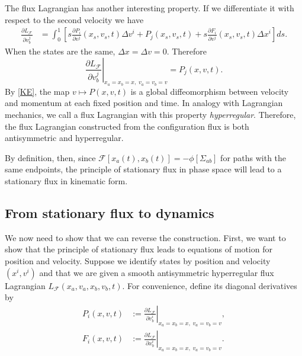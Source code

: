 \documentclass[nofootinbib,aps,pre]{revtex4-2}
\begin{document}
The flux Lagrangian has another interesting property. If we differentiate it with respect to the second velocity we have
\begin{equation}
	\begin{aligned}
		\frac{\partial L_{\mathcal{F}}}{\partial v_b^j}
		&=
		\int_0^1
		\left[
		s\frac{\partial P_i}{\partial v^j}(x_s,v_s,t)
		\Delta v^i
		+P_j(x_s,v_s,t)
		+s\frac{\partial F_i}{\partial v^j}(x_s,v_s,t)
		\Delta x^i
		\right]ds.
	\end{aligned}
\end{equation}
When the states are the same, $\Delta x=\Delta v=0$. Therefore
\begin{equation}
	\left.
	\frac{\partial L_{\mathcal{F}}}{\partial v_b^j}
	\right|_{x_a=x_b=x,\;v_a=v_b=v}
	=
	P_j(x,v,t).
\end{equation}
By \ref{KE}, the map $v \mapsto P(x,v,t)$ is a global diffeomorphism between velocity and momentum at each fixed position and time. In analogy with Lagrangian mechanics, we call a flux Lagrangian with this property \emph{hyperregular}. Therefore, the flux Lagrangian constructed from the configuration flux is both antisymmetric and hyperregular.

By definition, then, since $\mathcal{F}[x_a(t),x_b(t)]=-\phi[\Sigma_{ab}]$ for paths with the same endpoints, the principle of stationary flux in phase space will lead to a stationary flux in kinematic form.

\subsection{From stationary flux to dynamics}

We now need to show that we can reverse the construction. First, we want to show that the principle of stationary flux leads to equations of motion for position and velocity. Suppose we identify states by position and velocity $(x^i,v^i)$ and that we are given a smooth antisymmetric hyperregular flux Lagrangian $L_{\mathcal{F}}(x_a,v_a,x_b,v_b,t)$. For convenience, define its diagonal derivatives by
\begin{equation}\label{eq:fluxLagrangianDiagonal}
	\begin{aligned}
		P_i(x,v,t)
		&:=
		\left.
		\frac{\partial L_{\mathcal{F}}}{\partial v_b^i}
		\right|_{x_a=x_b=x,\;v_a=v_b=v},\\
		F_i(x,v,t)
		&:=
		\left.
		\frac{\partial L_{\mathcal{F}}}{\partial x_b^i}
		\right|_{x_a=x_b=x,\;v_a=v_b=v}.
	\end{aligned}
\end{equation}
\end{document}

